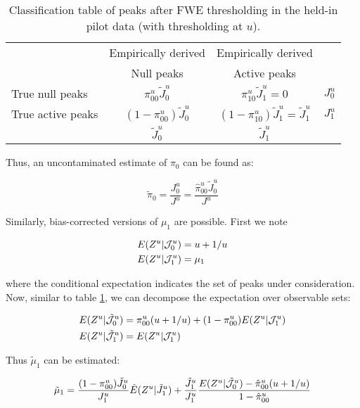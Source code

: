 \begin{table}[H]
  \begin{center}
\begin{tabular}{l|cc|l}
  \toprule
  & Empirically derived & Empirically derived \\
  & Null peaks & Active peaks \\
  \midrule
True null peaks & $\pi_{00}^u\tilde{J}_0^u$ & $\pi_{10}^u\tilde{J}_1^u =0$& $J_0^u$ \\
  True active peaks & $(1-\pi_{00}^u)\tilde{J}_0^u$ & $(1-\pi_{10}^u)\tilde{J}_1^u = \tilde{J}_1^u$  & $J_1^u$ \\
  \midrule
  & $\tilde{J}_0^u$ & $\tilde{J}_1^u$ & \\
  \bottomrule
\end{tabular}
\caption{Classification table of peaks after FWE thresholding in the held-in pilot data (with thresholding at $u$). \label{classFWE}}
\end{center}
\end{table}

Thus, an uncontaminated estimate of $\pi_0$ can be found as:


\begin{equation}
\tilde{\pi}_0 = \frac{J_0^u}{J^u} = \frac{\hat\pi_{00}^u\tilde{J}_0^u}{J^u} \nonumber
\end{equation}


Similarly, bias-corrected versions of $\mu_1$ are possible.  First we note

\begin{align}
E(Z^u | {\cal J}_0^u) &= u + 1/u \nonumber \\
E(Z^u | {\cal J}_1^u) &= \mu_1 \nonumber
\end{align}

where the conditional expectation indicates the set of peaks under consideration.  Now, similar to table \ref{classFWE}, we can decompose the expectation over observable sets:

\begin{align}
  E(Z^u|\tilde{\cal J}_0^u) &= \pi_{00}^u(u+1/u) + (1-\pi_{00}^u)E(Z^u | {\cal J}_1^u) \nonumber \\
  E(Z^u|\tilde{\cal J}_1^u) &= E(Z^u | {\cal J}_1^u) \nonumber
\end{align}

Thus $\tilde\mu_1$ can be estimated:

\begin{equation}
  \tilde\mu_1 = \frac{(1-\pi_{00}^u)\tilde{J}_0^u}{J_1^u}\hat E(Z^u | \tilde{J}_1^u) + \frac{\tilde{J}_1^u}{J^u_1}\frac{E(Z^u | \tilde{\cal J}_0^u)-\hat\pi_{00}^u(u+1/u)}{1-\hat\pi_{00}^u}
\end{equation}

